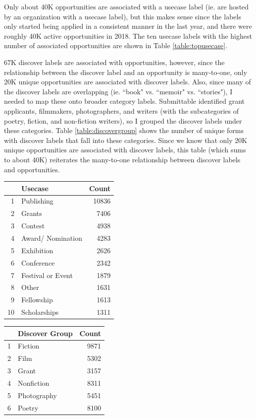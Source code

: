 \documentclass[]{report}   %
\begin{document}
Only about 40K opportunities are associated with a usecase label (ie. are hosted by an organization with a usecase label), but this makes sense since the labels only started being applied in a consistent manner in the last year, and there were roughly 40K active opportunities in 2018. The ten usecase labels with the highest number of associated opportunities are shown in Table \ref{table:topusecase}.  

67K discover labels are associated with opportunities, however, since the relationship between the discover label and an opportunity is many-to-one, only 20K unique opportunities are associated with discover labels. Also, since many of the discover labels are overlapping (ie. ``book" vs. ``memoir" vs. ``stories"), I needed to map these onto broader category labels. Submittable identified grant applicants, filmmakers, photographers, and writers (with the subcategories of poetry, fiction, and non-fiction writers), so I grouped the discover labels under these categories. Table \ref{table:discovergroup} shows the number of unique forms with discover labels that fall into these categories. Since we know that only 20K unique opportunities are associated with discover labels, this table (which sums to about 40K) reiterates the many-to-one relationship between discover labels and opportunities.

\begin{minipage}{0.45\textwidth}
\centering
{}
\label{table:topusecase}
\begin{tabular}{rlr}
  \hline
 & Usecase & Count \\ 
  \hline
1 & Publishing & 10836 \\ 
  2 & Grants & 7406 \\ 
  3 & Contest & 4938 \\ 
  4 & Award/ Nomination & 4283 \\ 
  5 & Exhibition & 2626 \\ 
  6 & Conference & 2342 \\ 
  7 & Festival or Event & 1879 \\ 
  8 & Other & 1631 \\ 
  9 & Fellowship & 1613 \\ 
  10 & Scholarships & 1311 \\ 
   \hline
\end{tabular}
\end{minipage}
\hfill
\begin{minipage}{0.45\textwidth}
     \centering
{}
\label{table:discovergroup}
\centering
\begin{tabular}{rlr}
  \hline
 & Discover Group & Count \\ 
  \hline
1 & Fiction & 9871 \\ 
  2 & Film & 5302 \\ 
  3 & Grant & 3157 \\ 
  4 & Nonfiction & 8311 \\ 
  5 & Photography & 5451 \\ 
  6 & Poetry & 8100 \\ 
   \hline
\end{tabular}
    \end{minipage}
\FloatBarrier
\end{document}
